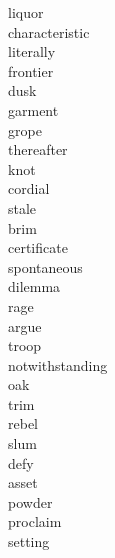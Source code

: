 \documentclass[a4paper, 11pt]{ctexart}
\begin{document}
\begin{multicols*}{3}
\begin{description}
\item[liquor]

\item[characteristic]

\item[literally]

\item[frontier]

\item[dusk]

\item[garment]

\item[grope]

\item[thereafter]

\item[knot]

\item[cordial]

\item[stale]

\item[brim]

\item[certificate]

\item[spontaneous]

\item[dilemma]

\item[rage]

\item[argue]

\item[troop]

\item[notwithstanding]

\item[oak]

\item[trim]

\item[rebel]

\item[slum]

\item[defy]

\item[asset]

\item[powder]

\item[proclaim]

\item[setting]


\end{description}
\end{multicols*}
\end{document}
